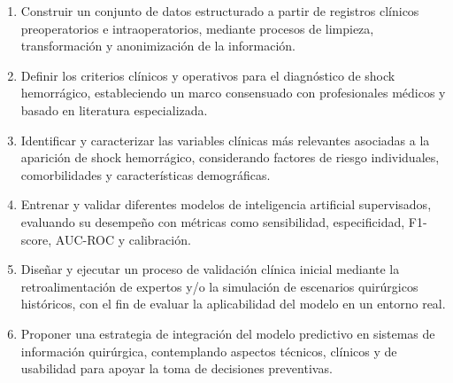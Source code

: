 \begin{enumerate}[label=\alph*)]
    \item Construir un conjunto de datos estructurado a partir de registros clínicos preoperatorios e intraoperatorios, mediante procesos de limpieza, transformación y anonimización de la información.
    \item Definir los criterios clínicos y operativos para el diagnóstico de shock hemorrágico, estableciendo un marco consensuado con profesionales médicos y basado en literatura especializada.
    \item Identificar y caracterizar las variables clínicas más relevantes asociadas a la aparición de shock hemorrágico, considerando factores de riesgo individuales, comorbilidades y características demográficas.
    \item Entrenar y validar diferentes modelos de inteligencia artificial supervisados, evaluando su desempeño con métricas como sensibilidad, especificidad, F1-score, AUC-ROC y calibración.
    \item Diseñar y ejecutar un proceso de validación clínica inicial mediante la retroalimentación de expertos y/o la simulación de escenarios quirúrgicos históricos, con el fin de evaluar la aplicabilidad del modelo en un entorno real.
    \item Proponer una estrategia de integración del modelo predictivo en sistemas de información quirúrgica, contemplando aspectos técnicos, clínicos y de usabilidad para apoyar la toma de decisiones preventivas.
\end{enumerate}

\newpage

